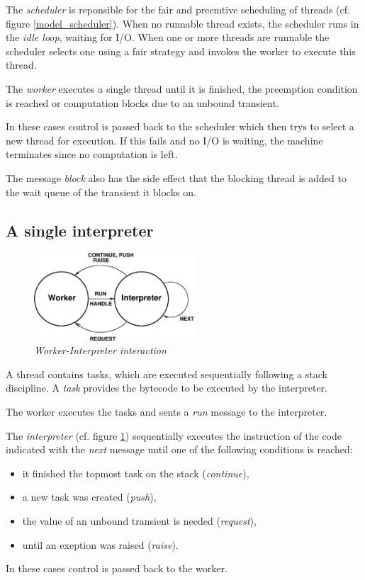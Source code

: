 The {\em scheduler} is reponsible for the fair and preemtive scheduling
of threads (cf. figure \ref{model_scheduler}).
When no runnable thread exists, the scheduler runs in the
{\em idle loop}, waiting for I/O. When one or more threads are runnable
the scheduler selects one using a fair strategy and invokes the worker
to execute this thread.

The {\em worker} executes a single thread until it is finished, the
preemption condition is reached or computation blocks due to an unbound
transient.

In these cases control is passed back to the scheduler
which then trys to select a new thread for execution.
If this fails and no I/O is waiting,
the machine terminates since no computation is left.

The message {\em block} also has the side effect that the
blocking thread is added to the
wait queue of the transient it blocks on.
\subsection{A single interpreter}
\begin{figure}[ht]
\centering
\includegraphics[width=6cm]{figures/exec_interpreter.eps}
\caption{\label{model_interpreter} {\it Worker-Interpreter interaction}}
\end{figure}

A thread contains tasks, which are executed sequentially following
a stack discipline.
A {\em task} provides the bytecode to be executed by the interpreter.

The worker executes the tasks and sents a {\em run}
message to the interpreter.

The {\em interpreter} (cf. figure \ref{model_interpreter}) sequentially executes
the instruction of the code indicated with
the {\em next} message until one of the following conditions is reached:
\begin{itemize}
\item
it finished the topmost task on the stack ({\em continue}),
\item
a new task was created ({\em push}),
\item
the value of an unbound transient is needed ({\em request}),
\item
until an exeption was raised ({\em raise}).
\end{itemize}
In these cases control is passed back to the worker.

